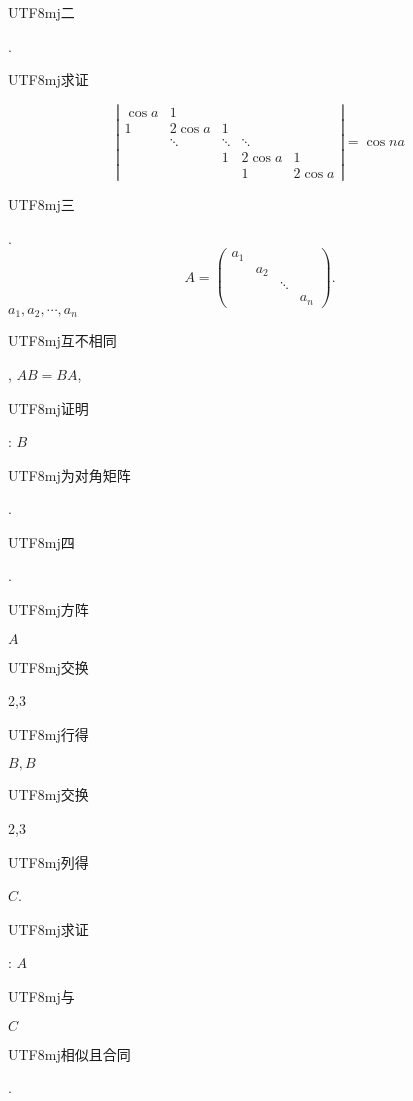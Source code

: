 \documentclass[10pt]{article}
\begin{document}
\begin{CJK}{UTF8}{mj}二\end{CJK}.\begin{CJK}{UTF8}{mj}求证\end{CJK}
$$
\left|\begin{array}{ccccc}
\cos a & 1 & & & \\
1 & 2 \cos a & 1 & & \\
& \ddots & \ddots & \ddots & \\
& & 1 & 2 \cos a & 1 \\
& & & 1 & 2 \cos a
\end{array}\right|=\cos n a
$$
\begin{CJK}{UTF8}{mj}三\end{CJK}.
$$
A=\left(\begin{array}{cccc}
a_{1} & & & \\
& a_{2} & & \\
& & \ddots & \\
& & & a_{n}
\end{array}\right) .
$$
$a_{1}, a_{2}, \cdots, a_{n}$ \begin{CJK}{UTF8}{mj}互不相同\end{CJK}, $A B=B A$, \begin{CJK}{UTF8}{mj}证明\end{CJK}: $B$ \begin{CJK}{UTF8}{mj}为对角矩阵\end{CJK}.

\begin{CJK}{UTF8}{mj}四\end{CJK}. \begin{CJK}{UTF8}{mj}方阵\end{CJK} $A$ \begin{CJK}{UTF8}{mj}交换\end{CJK} 2,3 \begin{CJK}{UTF8}{mj}行得\end{CJK} $B, B$ \begin{CJK}{UTF8}{mj}交换\end{CJK} 2,3 \begin{CJK}{UTF8}{mj}列得\end{CJK} $C$. \begin{CJK}{UTF8}{mj}求证\end{CJK}: $A$ \begin{CJK}{UTF8}{mj}与\end{CJK} $C$ \begin{CJK}{UTF8}{mj}相似且合同\end{CJK}.
\end{document}
